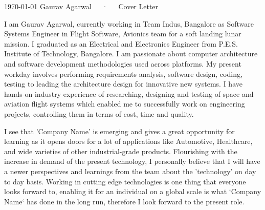 \documentclass[11pt, a4paper]{awesome-cv}
\begin{document}
\makecvheader[R]

\makecvfooter
  {\today}
  {Gaurav Agarwal~~~·~~~Cover Letter}
  {}

\makelettertitle

\begin{cvletter}


I am Gaurav Agarwal, currently working in Team Indus, Bangalore as Software Systems Engineer in Flight Software, Avionics team for a soft landing lunar mission. I graduated as an Electrical and Electronics Engineer from P.E.S. Institute of Technology, Bangalore. I am passionate about computer architecture and software development methodologies used across platforms. My present workday involves performing requirements analysis, software design, coding, testing to leading the architecture design for innovative new systems. I have hands-on industry experience of researching, designing and testing of space and aviation flight systems which enabled me to successfully work on engineering projects, controlling them in terms of cost, time and quality.


I see that 'Company Name' is emerging and gives a great opportunity for learning as it opens doors for a lot of applications like Automotive, Healthcare, and wide varieties of other industrial-grade products. Flourishing with the increase in demand of the present technology, I personally believe that I will have a newer perspectives and learnings from the team about the 'technology' on day to day basis. Working in cutting edge technologies is one thing that everyone looks forward to, enabling it for an individual on a global scale is what ‘Company Name‘ has done in the long run, therefore I look forward to the present role.



\end{cvletter}
\end{document}
